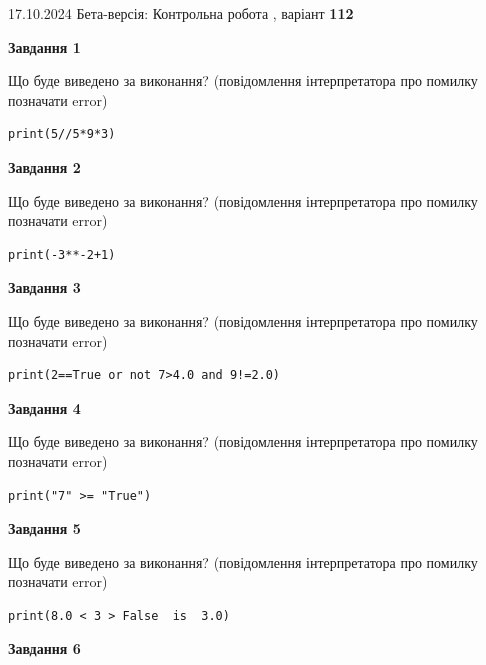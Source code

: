 \documentclass[12pt, ukrainian]{article}
\begin{document}
{\Large{17.10.2024 Бета-версія: Контрольна робота , варіант  \No \textbf { 112 }\par}}
{
\begin {large}
{\begin {center}\textbf{Завдання 1}\end {center}}

Що буде виведено за виконання? (повідомлення інтерпретатора про помилку позначати error)\par
\begin{verbatim}
print(5//5*9*3)
\end{verbatim}

{\begin {center}\textbf{Завдання 2}\end {center}}

Що буде виведено за виконання? (повідомлення інтерпретатора про помилку позначати error)\par
\begin{verbatim}
print(-3**-2+1)
\end{verbatim}

{\begin {center}\textbf{Завдання 3}\end {center}}

Що буде виведено за виконання? (повідомлення інтерпретатора про помилку позначати error)\par
\begin{verbatim}
print(2==True or not 7>4.0 and 9!=2.0)
\end{verbatim}

{\begin {center}\textbf{Завдання 4}\end {center}}

Що буде виведено за виконання? (повідомлення інтерпретатора про помилку позначати error)\par
\begin{verbatim}
print("7" >= "True")
\end{verbatim}

{\begin {center}\textbf{Завдання 5}\end {center}}

Що буде виведено за виконання? (повідомлення інтерпретатора про помилку позначати error)\par
\begin{verbatim}
print(8.0 < 3 > False  is  3.0)
\end{verbatim}

{\begin {center}\textbf{Завдання 6}\end {center}}


\end{large}}
\end{document}
